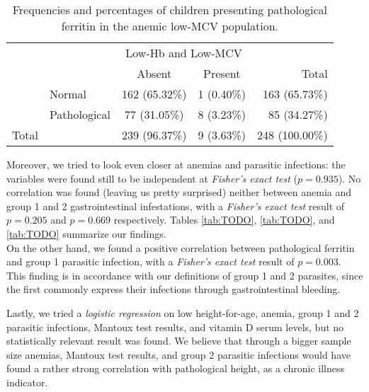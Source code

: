 \begin{table}[H]
   \centering
   \begin{tabular}{c l c c | r}
   	  & & \multicolumn{2}{c}{Low-Hb and Low-MCV} & \\
   	  \cline{3-4}
       & & Absent & Present & Total\\
      \hline
       \parbox[t]{2mm}{} & Normal & 162 (65.32\%) & 1 (0.40\%) & 163 (65.73\%)\\
       & Pathological & 77 (31.05\%) & 8 (3.23\%) & 85 (34.27\%)\\
      \hline
      Total & & 239 (96.37\%) & 9 (3.63\%) & 248 (100.00\%)\\
   \end{tabular}
   \caption{Frequencies and percentages of children presenting pathological ferritin in the anemic low-MCV population.}
    \label{tab:Ferritin_HbMCV}
\end{table}

Moreover, we tried to look even closer at anemias and parasitic infections: the variables were found still to be independent at \textit{Fisher's exact test} ($p=0.935$). No correlation was found (leaving us pretty surprised) neither between anemia and group 1 and 2 gastrointestinal infestations, with a \textit{Fisher's exact test} result of $p=0.205$ and $p=0.669$ respectively. Tables \ref{tab:TODO}, \ref{tab:TODO}, and \ref{tab:TODO} summarize our findings.\\
On the other hand, we found a positive correlation between pathological ferritin and group 1 parasitic infection, with a \textit{Fisher's exact test} result of $p=0.003$. This finding is in accordance with our definitions of group 1 and 2 parasites, since the first commonly express their infections through gastrointestinal bleeding.



Lastly, we tried a \textit{logistic regression} on low height-for-age, anemia, group 1 and 2 parasitic infections, Mantoux test results, and vitamin D serum levels, but no statistically relevant result was found. We believe that through a bigger sample size anemias, Mantoux test results, and group 2 parasitic infections would have found a rather strong correlation with pathological height, as a chronic illness indicator.
